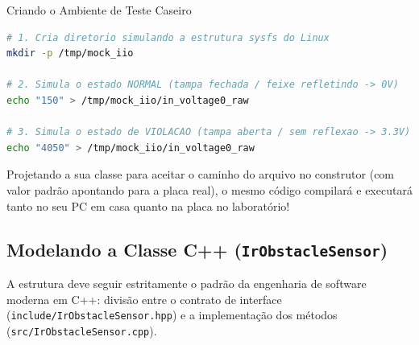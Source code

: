 \documentclass[11pt,a4paper]{article}
\begin{document}
\begin{homebox}{Criando o Ambiente de Teste Caseiro}
\begin{lstlisting}[language=bash]
# 1. Cria diretorio simulando a estrutura sysfs do Linux
mkdir -p /tmp/mock_iio

# 2. Simula o estado NORMAL (tampa fechada / feixe refletindo -> 0V)
echo "150" > /tmp/mock_iio/in_voltage0_raw

# 3. Simula o estado de VIOLACAO (tampa aberta / sem reflexao -> 3.3V)
echo "4050" > /tmp/mock_iio/in_voltage0_raw
\end{lstlisting}
Projetando a sua classe para aceitar o caminho do arquivo no construtor (com valor padrão apontando para a placa real), o mesmo código compilará e executará tanto no seu PC em casa quanto na placa no laboratório!
\end{homebox}

\subsection{Modelando a Classe C++ (\texttt{IrObstacleSensor})}
A estrutura deve seguir estritamente o padrão da engenharia de software moderna em C++: divisão entre o contrato de interface (\texttt{include/IrObstacleSensor.hpp}) e a implementação dos métodos (\texttt{src/IrObstacleSensor.cpp}).
\end{document}
